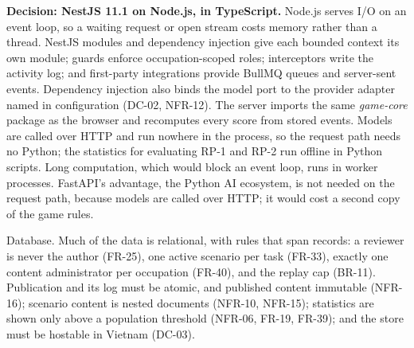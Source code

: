 \textbf{Decision: NestJS 11.1 on Node.js, in TypeScript.} Node.js serves I/O on an event loop, so a waiting request or open stream costs memory rather than a thread. NestJS modules and dependency injection give each bounded context its own module; guards enforce occupation-scoped roles; interceptors write the activity log; and first-party integrations provide BullMQ queues and server-sent events\cite{r149}. Dependency injection also binds the model port to the provider adapter named in configuration (DC-02, NFR-12)\cite{r150}. The server imports the same \textit{game-core} package as the browser and recomputes every score from stored events. Models are called over HTTP and run nowhere in the process, so the request path needs no Python; the statistics for evaluating RP-1 and RP-2 run offline in Python scripts. Long computation, which would block an event loop, runs in worker processes. FastAPI's advantage, the Python AI ecosystem, is not needed on the request path, because models are called over HTTP; it would cost a second copy of the game rules.

Database. Much of the data is relational, with rules that span records: a reviewer is never the author (FR-25), one active scenario per task (FR-33), exactly one content administrator per occupation (FR-40), and the replay cap (BR-11). Publication and its log must be atomic, and published content immutable (NFR-16); scenario content is nested documents (NFR-10, NFR-15); statistics are shown only above a population threshold (NFR-06, FR-19, FR-39); and the store must be hostable in Vietnam (DC-03).

